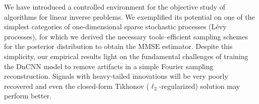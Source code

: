 We have introduced a controlled environment for the objective study of
algorithms for linear inverse problems. We exemplified its potential on one of
the simplest categories of one-dimensional sparse stochastic processes
(L\'{e}vy processes), for which we derived the necessary tools--efficient
sampling schemes for the posterior distribution to obtain the MMSE estimator.
Despite this simplicity, our empirical results light on the fundamental
challenges of training the DnCNN model to remove artifacts in a simple Fourier
sampling reconstruction. Signals with heavy-tailed innovations will be very
poorly recovered and even the closed-form Tikhonov ($\ell_2$-regularized)
solution may perform better.

